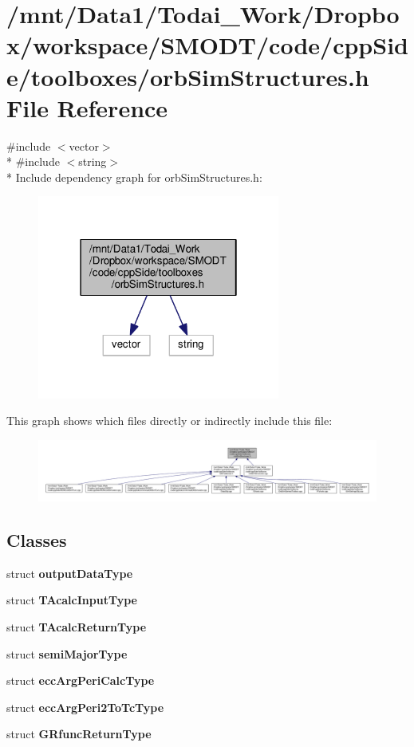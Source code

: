 \section{/mnt/\-Data1/\-Todai\-\_\-\-Work/\-Dropbox/workspace/\-S\-M\-O\-D\-T/code/cpp\-Side/toolboxes/orb\-Sim\-Structures.h File Reference}
\label{orb_sim_structures_8h}
{\ttfamily \#include $<$vector$>$}\\*
{\ttfamily \#include $<$string$>$}\\*
Include dependency graph for orb\-Sim\-Structures.\-h\-:\nopagebreak
\begin{figure}[H]
\begin{center}
\leavevmode
\includegraphics[width=226pt]{orb_sim_structures_8h__incl}
\end{center}
\end{figure}
This graph shows which files directly or indirectly include this file\-:\nopagebreak
\begin{figure}[H]
\begin{center}
\leavevmode
\includegraphics[width=350pt]{orb_sim_structures_8h__dep__incl}
\end{center}
\end{figure}
\subsection*{Classes}
\begin{DoxyCompactItemize}
\item 
struct {\bf output\-Data\-Type}
\item 
struct {\bf T\-Acalc\-Input\-Type}
\item 
struct {\bf T\-Acalc\-Return\-Type}
\item 
struct {\bf semi\-Major\-Type}
\item 
struct {\bf ecc\-Arg\-Peri\-Calc\-Type}
\item 
struct {\bf ecc\-Arg\-Peri2\-To\-Tc\-Type}
\item 
struct {\bf G\-Rfunc\-Return\-Type}
\end{DoxyCompactItemize}
